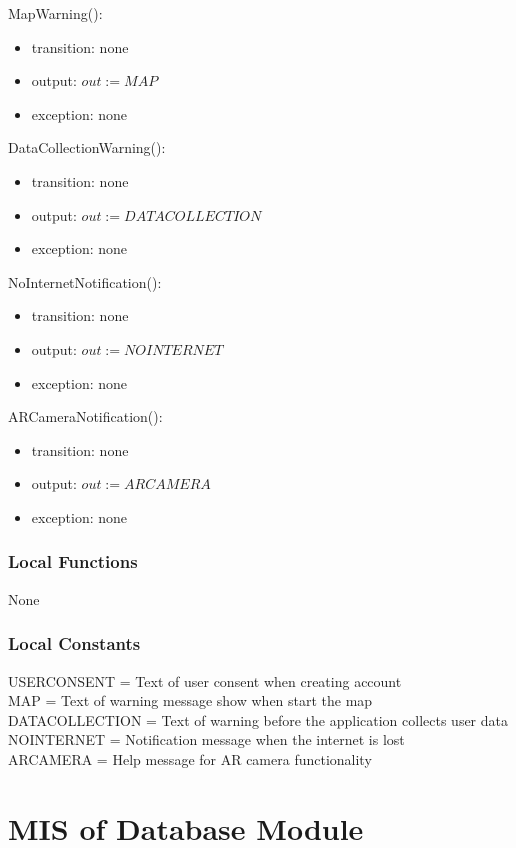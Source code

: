\documentclass[12pt, titlepage]{article}
\begin{document}
\noindent MapWarning():
\begin{itemize}
\item transition: none
\item output: $out := MAP$
\item exception: none
\end{itemize}

\noindent DataCollectionWarning():
\begin{itemize}
\item transition: none
\item output: $out := DATACOLLECTION$
\item exception: none
\end{itemize}

\noindent NoInternetNotification():
\begin{itemize}
\item transition: none
\item output: $out := NOINTERNET$
\item exception: none
\end{itemize}

\noindent ARCameraNotification():
\begin{itemize}
\item transition: none
\item output: $out := ARCAMERA$
\item exception: none
\end{itemize}

\subsubsection{Local Functions}

None

\subsubsection{Local Constants}
USERCONSENT = Text of user consent when creating account\\
MAP = Text of warning message show when start the map\\
DATACOLLECTION = Text of warning before the application collects user data\\
NOINTERNET = Notification message when the internet is lost\\
ARCAMERA =  Help message for AR camera functionality\\

\newpage

\section{MIS of Database Module} \label{mDB}
\end{document}
